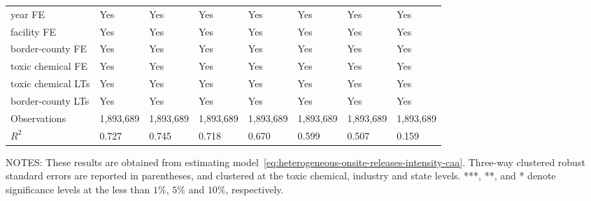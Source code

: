 \begin{table}[H]
{\begin{tabular}{@{}llllllll@{}}
            year FE                         & Yes       & Yes           & Yes       & Yes          & Yes             & Yes           & Yes                 \\
            facility FE                     & Yes       & Yes           & Yes       & Yes          & Yes             & Yes           & Yes                 \\
            border-county FE                & Yes       & Yes           & Yes       & Yes          & Yes             & Yes           & Yes                 \\
            toxic chemical FE               & Yes       & Yes           & Yes       & Yes          & Yes             & Yes           & Yes                 \\
            toxic chemical LTs              & Yes       & Yes           & Yes       & Yes          & Yes             & Yes           & Yes                 \\
            border-county LTs               & Yes       & Yes           & Yes       & Yes          & Yes             & Yes           & Yes                 \\\midrule
            Observations                    & 1,893,689 & 1,893,689     & 1,893,689 & 1,893,689    & 1,893,689       & 1,893,689     & 1,893,689           \\
            $R^2$                           & 0.727     & 0.745         & 0.718     & 0.670        & 0.599           & 0.507         & 0.159               \\ \bottomrule\bottomrule
        \end{tabular}%
    }
    \begin{minipage}{\columnwidth}
        \vspace{0.05in}
        \tiny NOTES: These results are obtained from estimating model~\ref{eq:heterogeneous-onsite-releases-intensity-caa}. Three-way clustered robust standard errors are reported in parentheses, and clustered at the toxic chemical, industry and state levels. ***, **, and * denote significance levels at the less than $1\%$, $5\%$ and $10\%$, respectively.
    \end{minipage}
\end{table}